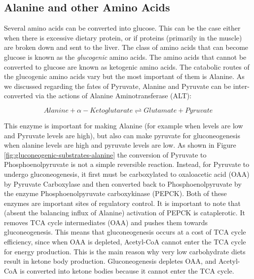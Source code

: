 \documentclass{tufte-handout}
\begin{document}
\subsection{Alanine and other Amino Acids}

Several amino acids can be converted into glucose.  This can be the case either when there is excessive dietary protein, or if proteins (primarily in the muscle) are broken down and sent to the liver.  The class of amino acids that can become glucose is known as the \emph{glucogenic} amino acids.  The amino acids that cannot be converted to glucose are known as ketogenic amino acids.  The catabolic routes of the glucogenic amino acids vary but the most important of them is Alanine. As we discussed regarding the fates of Pyruvate, Alanine and Pyruvate can be inter-converted via the actions of Alanine Aminotransferase (ALT):


\begin{equation}\label{eq:alt}
Alanine + \alpha - Ketoglutarate \rightleftharpoons Glutamate + Pyruvate
\end{equation}

This enzyme is important for making Alanine (for example when levels are low and Pyruvate levels are high), but also can make pyruvate for gluconeogenesis when alanine levels are high and pyruvate levels are low.  As shown in Figure \ref{fig:gluconeogenic-substrates-alanine} the conversion of Pyruvate to Phosphoenolpyruvate is not a simple reversible reaction.  Instead, for Pyruvate to undergo gluconeogenesis, it first must be carboxylated to oxaloacetic acid (OAA) by Pyruvate Carboxylase and then converted back to Phosphoenolpyruvate by the enzyme Phosphoenolpyruvate carboxykinase (PEPCK).  Both of these enzymes are important sites of regulatory control. It is important to note that (absent the balancing influx of Alanine) activation of PEPCK is cataplerotic.  It removes TCA cycle intermediates (OAA) and pushes them towards gluconeogenesis.  This means that gluconeogenesis occurs at a cost of TCA cycle efficiency, since when OAA is depleted, Acetyl-CoA cannot enter the TCA cycle for energy production.  This is the main reason why very low carbohydrate diets result in ketone body production.  Gluconeogenesis depletes OAA, and Acetyl-CoA is converted into ketone bodies because it cannot enter the TCA cycle.
\end{document}
